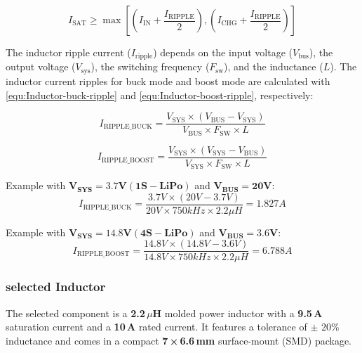 \documentclass[12pt]{article}
\begin{document}
\begin{equation}
I_{\text{SAT}} \geq \max \left[ \left( I_{\text{IN}} + \frac{I_{\text{RIPPLE}}}{2} \right), \left( I_{\text{CHG}} + \frac{I_{\text{RIPPLE}}}{2} \right) \right]
    \label{equ:Inductor-Selection}
\end{equation}

The inductor ripple current ($I_{\text{ripple}}$) depends on the input voltage ($V_{\text{bus}}$), the output voltage ($V_{\text{sys}}$), the switching frequency ($F_{\text{sw}}$), and the inductance ($L$). The inductor current ripples for buck mode and boost mode are calculated with \autoref{equ:Inductor-buck-ripple} and \autoref{equ:Inductor-boost-ripple}, respectively:


\begin{equation}
    I_{\text{RIPPLE\_BUCK}} = \frac{V_{\text{SYS}} \times (V_{\text{BUS}} - V_{\text{SYS}})}{V_{\text{BUS}} \times F_{\text{SW}} \times L}
    \label{equ:Inductor-buck-ripple}
\end{equation}

\begin{equation}
    I_{\text{RIPPLE\_BOOST}} = \frac{V_{\text{SYS}} \times (V_{\text{SYS}} - V_{\text{BUS}})}{V_{\text{SYS}} \times F_{\text{SW}} \times L}
    \label{equ:Inductor-boost-ripple}
\end{equation}

Example with \(\mathbf{V_{SYS} = 3.7V (1S-LiPo)}\) and \(\mathbf{V_{BUS} = 20V}\):
\begin{equation}
    I_{\text{RIPPLE\_BUCK}} = \frac{3.7V \times (20V - 3.7V)}{20V \times 750kHz \times 2.2\mu H} = 1.827A
    \label{equ:Inductor-buck-ripple-Example}
\end{equation}

Example with \(\mathbf{V_{SYS} = 14.8V (4S-LiPo)}\) and \(\mathbf{V_{BUS} = 3.6V}\):
\begin{equation}
    I_{\text{RIPPLE\_BOOST}} = \frac{14.8V \times (14.8V - 3.6V)}{14.8V \times 750kHz \times 2.2\mu H} = 6.788A
    \label{equ:Inductor-boost-ripple-Example}
\end{equation}

\subsubsection{selected Inductor}
The selected component is a \textbf{2.2\,\(\mu\)H} molded power inductor with a \textbf{9.5\,A} saturation current and a \textbf{10\,A} rated current. It features a tolerance of \(\pm\) 20\% inductance and comes in a compact \textbf{7\,×\,6.6\,mm} surface-mount (SMD) package.
\end{document}
